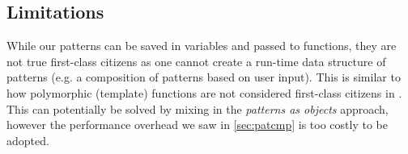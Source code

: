 

\subsection{Limitations}
\label{sec:ommlimit}

While our patterns can be saved in variables and passed to functions, they are 
not true first-class citizens as one cannot create a run-time data structure of 
patterns (e.g. a composition of patterns based on user input). This is similar 
to how polymorphic (template) functions are not considered first-class citizens 
in \Cpp{}. This can potentially be solved by mixing in the \emph{patterns as objects} 
approach, however the performance overhead we saw in 
\textsection\ref{sec:patcmp} is too costly to be adopted.
